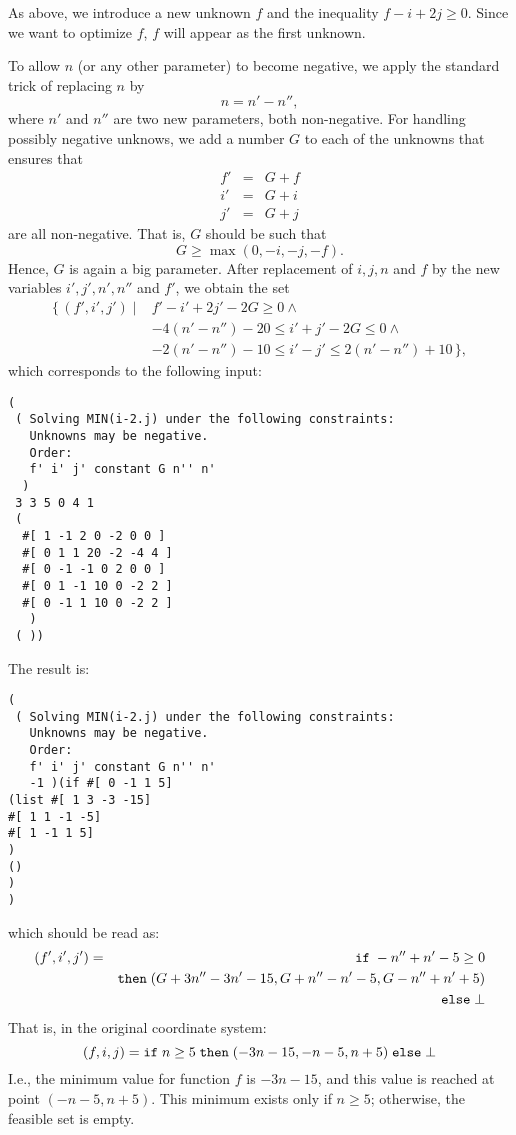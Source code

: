 \documentclass[12pt,a4paper,dvips]{article}
\begin{document}
As above,
we introduce a new unknown $f$ and the inequality $f-i+2j \geq
0$. Since we want to optimize $f$, $f$ will appear
as the first unknown.

To allow $n$ (or any other parameter) to become negative, 
we apply the standard trick of
replacing $n$ by $$n = n' - n'',$$ where $n'$ and $n''$ are two new
parameters, both non-negative.
For handling possibly negative unknows, we add a number $G$ to each of the
unknowns that ensures that
\begin{eqnarray*}
f' &=& G + f \\
i' &=& G + i \\
j' &=& G + j
\end{eqnarray*}
are all non-negative. That is, $G$ should be such that
$$
G \ge \max(0,-i,-j,-f).
$$
Hence, $G$
is again a big parameter. 
After replacement of $i,j,n$ and $f$ by the new variables
$i',j',n',n''$ and $f'$, we obtain the set
\begin{equation*}
\begin{aligned}
\{\,
(f',i',j') \mid {}
& f' -i' + 2j' - 2 G \ge 0 \wedge {} \\
& -4 (n'-n'') -20 \le i' + j' - 2 G \le 0 \wedge {} \\
& -2 (n'-n'') - 10 \le i' - j' \le 2 (n'-n'') + 10
\,\},
\end{aligned}
\end{equation*}
which corresponds to the following input:
\begin{verbatim}
( 
 ( Solving MIN(i-2.j) under the following constraints:
   Unknowns may be negative.
   Order:
   f' i' j' constant G n'' n'
  )
 3 3 5 0 4 1
 ( 
  #[ 1 -1 2 0 -2 0 0 ]
  #[ 0 1 1 20 -2 -4 4 ]
  #[ 0 -1 -1 0 2 0 0 ]
  #[ 0 1 -1 10 0 -2 2 ]
  #[ 0 -1 1 10 0 -2 2 ]
   )
 ( ))
\end{verbatim}

The result is:
\begin{verbatim}
( 
 ( Solving MIN(i-2.j) under the following constraints:
   Unknowns may be negative.
   Order:
   f' i' j' constant G n'' n'
   -1 )(if #[ 0 -1 1 5]
(list #[ 1 3 -3 -15]
#[ 1 1 -1 -5]
#[ 1 -1 1 5]
)
()
)
)
\end{verbatim}
which should be read as:
\begin{eqnarray*}
 (f',i',j') & = & {\tt if}\;  -n''+n'-5 \geq 0 \\
            &   & {\tt then} \; (G+3n''-3n'-15, G+n''-n'-5,G-n''+n'+5) \\
            &   & {\tt else} \; \bot
\end{eqnarray*}
That is, in the original coordinate system:
\[ (f,i,j) = {\tt if}\;  n \geq 5 \; {\tt then} \; (-3n-15, -n-5, n+5)
 \; {\tt else} \; \bot \]
I.e., the minimum value for function $f$ is $-3n-15$, and this value
is reached at point $(-n-5, n+5)$. This minimum exists only if $n \ge 5$;
otherwise, the feasible set is empty.
\end{document}
